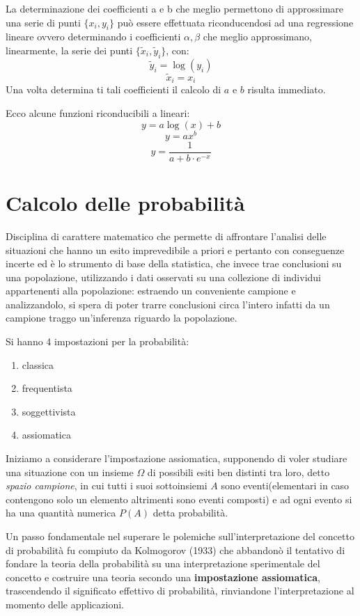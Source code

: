 \documentclass[a4paper,12pt, oneside]{book}
\begin{document}
La determinazione dei coefficienti a e b che meglio permettono di approssimare una serie di punti $\{x_i,y_i\}$ 
può essere effettuata riconducendosi ad una regressione lineare ovvero determinando i coefficienti $\alpha,\beta$ 
che meglio approssimano, linearmente, la serie dei punti $\{\widetilde{x}_i,\widetilde{y}_i\}$, con:
\[ \widetilde{y}_i = \log(y_i) \]
\[ \widetilde{x}_i = x_i \]
Una volta determina ti tali coefficienti il calcolo di $a$ e $b$ risulta immediato. 

Ecco alcune funzioni riconducibili a lineari:
\[ y = a \log(x) + b \]
\[ y=ax^b \]
\[ y=\frac{1}{a+b\cdot e^{-x}} \]

\chapter{Calcolo delle probabilità}
Disciplina di carattere matematico che permette di affrontare l'analisi delle situazioni che hanno un esito imprevedibile
a priori e pertanto con conseguenze incerte ed è lo strumento di base della statistica, che invece trae conclusioni
su una popolazione, utilizzando i dati osservati su una collezione di individui appartenenti alla popolazione:
estraendo un conveniente campione e analizzandolo, si spera di poter trarre conclusioni circa l'intero infatti 
da un campione traggo un'inferenza riguardo la popolazione.

Si hanno 4 impostazioni per la probabilità:
\begin{enumerate}
    \item classica
    \item frequentista
    \item soggettivista
    \item assiomatica
\end{enumerate}
Iniziamo a considerare l'impostazione assiomatica, supponendo di voler studiare una situazione con un insieme $\Omega$
di possibili esiti ben distinti tra loro, detto \emph{spazio campione}, in cui tutti i suoi sottoinsiemi
$A$ sono eventi(elementari in caso contengono solo un elemento altrimenti sono eventi composti)
e ad ogni evento si ha una quantità numerica $P(A)$ detta probabilità.

Un passo fondamentale nel superare le polemiche sull'interpretazione del concetto di probabilità
fu compiuto da Kolmogorov (1933) che abbandonò il tentativo di fondare la teoria della probabilità su una 
interpretazione sperimentale del concetto e costruire una teoria secondo una \textbf{impostazione assiomatica},
trascendendo il significato effettivo di probabilità, rinviandone l'interpretazione al momento delle applicazioni.
\end{document}

